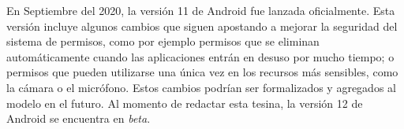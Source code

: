En Septiembre del 2020, la versión 11 de Android fue lanzada oficialmente. Esta versión incluye
algunos cambios que siguen apostando a mejorar la seguridad del sistema de permisos, como por
ejemplo permisos que se eliminan automáticamente cuando las aplicaciones entrán en desuso por mucho
tiempo; o permisos que pueden utilizarse una única vez en los recursos más sensibles, como la cámara
o el micrófono. Estos cambios podrían ser formalizados y agregados al modelo en el futuro. Al
momento de redactar esta tesina, la versión 12 de Android se encuentra en \textit{beta}.
